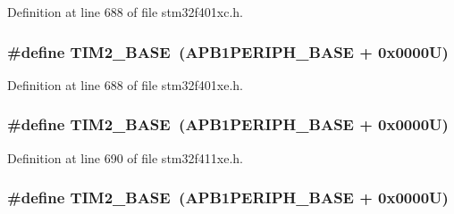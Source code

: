 Definition at line 688 of file stm32f401xc.\+h.

\subsubsection[{\texorpdfstring{T\+I\+M2\+\_\+\+B\+A\+SE}{TIM2_BASE}}]{\setlength{\rightskip}{0pt plus 5cm}\#define T\+I\+M2\+\_\+\+B\+A\+SE~({\bf A\+P\+B1\+P\+E\+R\+I\+P\+H\+\_\+\+B\+A\+SE} + 0x0000\+U)}\hypertarget{group___peripheral__registers__structures_ga00d0fe6ad532ab32f0f81cafca8d3aa5}{}\label{group___peripheral__registers__structures_ga00d0fe6ad532ab32f0f81cafca8d3aa5}


Definition at line 688 of file stm32f401xe.\+h.

\subsubsection[{\texorpdfstring{T\+I\+M2\+\_\+\+B\+A\+SE}{TIM2_BASE}}]{\setlength{\rightskip}{0pt plus 5cm}\#define T\+I\+M2\+\_\+\+B\+A\+SE~({\bf A\+P\+B1\+P\+E\+R\+I\+P\+H\+\_\+\+B\+A\+SE} + 0x0000\+U)}\hypertarget{group___peripheral__registers__structures_ga00d0fe6ad532ab32f0f81cafca8d3aa5}{}\label{group___peripheral__registers__structures_ga00d0fe6ad532ab32f0f81cafca8d3aa5}


Definition at line 690 of file stm32f411xe.\+h.

\subsubsection[{\texorpdfstring{T\+I\+M2\+\_\+\+B\+A\+SE}{TIM2_BASE}}]{\setlength{\rightskip}{0pt plus 5cm}\#define T\+I\+M2\+\_\+\+B\+A\+SE~({\bf A\+P\+B1\+P\+E\+R\+I\+P\+H\+\_\+\+B\+A\+SE} + 0x0000\+U)}\hypertarget{group___peripheral__registers__structures_ga00d0fe6ad532ab32f0f81cafca8d3aa5}{}\label{group___peripheral__registers__structures_ga00d0fe6ad532ab32f0f81cafca8d3aa5}


